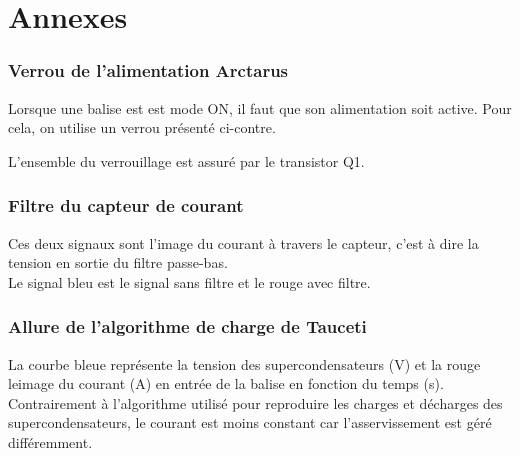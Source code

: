 
\chapter{Annexes}

\subsection{Verrou de l'alimentation Arctarus}


Lorsque une balise est est mode ON, il faut que son alimentation soit active. Pour cela, on utilise un verrou présenté ci-contre.



L'ensemble du verrouillage est assuré par le transistor Q1.

\subsection{Filtre du capteur de courant}
Ces deux signaux sont l'image du courant à travers le capteur, c'est à dire la tension en sortie du filtre passe-bas.\\
Le signal bleu est le signal sans filtre et le rouge avec filtre.




\subsection{Allure de l'algorithme de charge de Tauceti}

La courbe bleue représente la tension des supercondensateurs (V) et la rouge leimage du courant (A) en entrée de la balise en fonction du temps (s). \\Contrairement à l'algorithme utilisé pour reproduire les charges et décharges des supercondensateurs, le courant est moins constant car l'asservissement est géré différemment.


